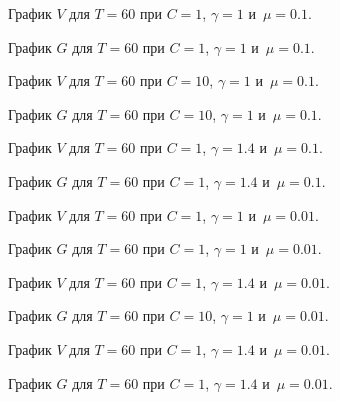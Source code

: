 \begin{figure}[H]
\caption{График $V$ для $T = 60$ при $C = 1$, $\gamma = 1$ и~$\mu = 0.1$.}
\end{figure}
\begin{figure}[H]
\caption{График $G$ для $T = 60$ при $C = 1$, $\gamma = 1$ и~$\mu = 0.1$.}
\end{figure}

\begin{figure}[H]
\caption{График $V$ для $T = 60$ при $C = 10$, $\gamma = 1$ и~$\mu = 0.1$.}
\end{figure}
\begin{figure}[H]
\caption{График $G$ для $T = 60$ при $C = 10$, $\gamma = 1$ и~$\mu = 0.1$.}
\end{figure}


\begin{figure}[H]
\caption{График $V$ для $T = 60$ при $C = 1$, $\gamma = 1.4$ и~$\mu = 0.1$.}
\end{figure}
\begin{figure}[H]
\caption{График $G$ для $T = 60$ при $C = 1$, $\gamma = 1.4$ и~$\mu = 0.1$.}
\end{figure}


\begin{figure}[H]
\caption{График $V$ для $T = 60$ при $C = 1$, $\gamma = 1$ и~$\mu = 0.01$.}
\end{figure}
\begin{figure}[H]
\caption{График $G$ для $T = 60$ при $C = 1$, $\gamma = 1$ и~$\mu = 0.01$.}
\end{figure}


\begin{figure}[H]
\caption{График $V$ для $T = 60$ при $C = 1$, $\gamma = 1.4$ и~$\mu = 0.01$.}
\end{figure}
\begin{figure}[H]
\caption{График $G$ для $T = 60$ при $C = 10$, $\gamma = 1$ и~$\mu = 0.01$.}
\end{figure}


\begin{figure}[H]
\caption{График $V$ для $T = 60$ при $C = 1$, $\gamma = 1.4$ и~$\mu = 0.01$.}
\end{figure}
\begin{figure}[H]
\caption{График $G$ для $T = 60$ при $C = 1$, $\gamma = 1.4$ и~$\mu = 0.01$.}
\end{figure}
